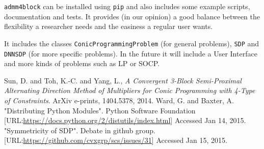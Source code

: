 \documentclass[paper=a4, fontsize=11pt]{scrartcl}
\numberwithin{equation}{section}		%
\numberwithin{figure}{section}			%
\numberwithin{table}{section}				%
\begin{document}
\texttt{admm4block} can be installed using \texttt{pip} and also includes some example scripts, documentation and tests. It provides (in our opinion) a good balance between the flexibility a researcher needs and the easiness a regular user wants. 

It includes the classes 
\texttt{ConicProgrammingProblem} (for general problems), \texttt{SDP} and \texttt{DNNSDP} (for more specific problems). In the future it will include a User Interface and more kinds of problems such as LP or SOCP.


\begin{thebibliography}{9}

  {{Sun}, D. and {Toh}, K.-C. and {Yang}, L.},
  \emph{A Convergent 3-Block Semi-Proximal Alternating Direction Method of Multipliers for Conic Programming with 4-Type of Constraints}.
  ArXiv e-prints,
  1404.5378,
  2014.
	{Ward, G. and Baxter, A.}
	"Distributing Python Modules". Python Software Foundation
	[URL:\url{https://docs.python.org/2/distutils/index.html}] Accessed Jan 14, 2015.
	"Symmetricity of SDP". Debate in github group.
	[URL:\url{https://github.com/cvxgrp/scs/issues/31}] Accessed Jan 15, 2015.
\end{thebibliography}


\end{document}
